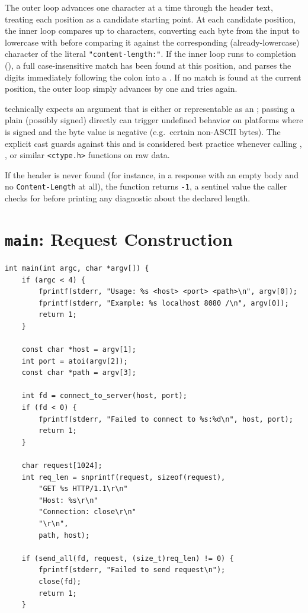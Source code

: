 The outer  loop advances one character at a time through the header text, treating each position as a candidate starting point. At each candidate position, the inner loop compares up to  characters, converting each byte from the input to lowercase with  before comparing it against the corresponding (already-lowercase) character of the literal \texttt{"content-length:"}. If the inner loop runs to completion (), a full case-insensitive match has been found at this position, and  parses the digits immediately following the colon into a . If no match is found at the current position, the outer loop simply advances  by one and tries again.

\begin{warnbox}
 technically expects an  argument that is either  or representable as an ; passing a plain (possibly signed)  directly can trigger undefined behavior on platforms where  is signed and the byte value is negative (e.g.\ certain non-ASCII bytes). The explicit cast  guards against this and is considered best practice whenever calling , , or similar \texttt{<ctype.h>} functions on raw  data.
\end{warnbox}

If the header is never found (for instance, in a response with an empty body and no \texttt{Content-Length} at all), the function returns \texttt{-1}, a sentinel value the caller checks for before printing any diagnostic about the declared length.

\section{\texttt{main}: Request Construction}

\begin{lstlisting}[style=cstyle]
int main(int argc, char *argv[]) {
    if (argc < 4) {
        fprintf(stderr, "Usage: %s <host> <port> <path>\n", argv[0]);
        fprintf(stderr, "Example: %s localhost 8080 /\n", argv[0]);
        return 1;
    }

    const char *host = argv[1];
    int port = atoi(argv[2]);
    const char *path = argv[3];

    int fd = connect_to_server(host, port);
    if (fd < 0) {
        fprintf(stderr, "Failed to connect to %s:%d\n", host, port);
        return 1;
    }

    char request[1024];
    int req_len = snprintf(request, sizeof(request),
        "GET %s HTTP/1.1\r\n"
        "Host: %s\r\n"
        "Connection: close\r\n"
        "\r\n",
        path, host);

    if (send_all(fd, request, (size_t)req_len) != 0) {
        fprintf(stderr, "Failed to send request\n");
        close(fd);
        return 1;
    }
\end{lstlisting}

